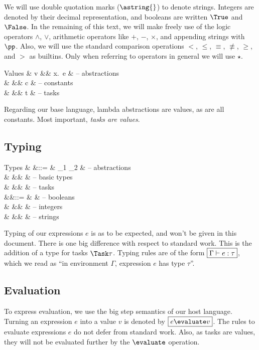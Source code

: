 We will use double quotation marks ($\astring{}$) to denote strings.
Integers are denoted by their decimal representation,
and booleans are written $\True$ and $\False$.
In the remaining of this text,
we will make freely use of the logic operators $\land$, $\lor$,
arithmetic operators like $+$, $-$, $\times$,
and appending strings with $\pp$.
Also, we will use the standard comparison operations $<$, $\le$, $\equiv$, $\nequiv$, $\ge$, and $>$
as builtins.
Only when referring to operators in general we will use $\star$.



\begin{grammar}
  Values
    & v &\mid& \lambda x.\ e  & – abstractions \\
    &   &\mid& c              & – constants \\
    &   &\mid& t              & – tasks \\
\end{grammar}
Regarding our base language, lambda abstractions are values, as are all constants.
Most important, \emph{tasks are values}.


\subsection{Typing}

\begin{grammar}
  Types
    & \tau &::= & \tau_1 \to \tau_2 & – abstractions \\
    &      &\mid& \beta             & – basic types \\
    &      &\mid& \Task \tau        & – tasks \\
    &\beta &::= & \Bool             & – booleans \\
    &      &\mid& \Int              & – integers \\
    &      &\mid& \String           & – strings \\
\end{grammar}
Typing of our expressions $e$ is as to be expected,
and won't be given in this document.
There is one big difference with respect to standard work.
This is the addition of a type for tasks $\Task \tau$.
Typing rules are of the form $\boxed{\Gamma \vdash e : \tau}$,
which we read as \enquote{in environment $\Gamma$, expression $e$ has type $\tau$}.


\subsection{Evaluation}

To express evaluation,
we use the big step semantics of our host language.
Turning an expression $e$ into a value $v$ is denoted by $\boxed{e \evaluate v}$.
The rules to evaluate expressions $e$ do not defer from standard work.
Also, as tasks are values, they will not be evaluated further by the $\evaluate$ operation.
